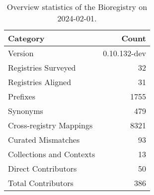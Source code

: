 \begin{table}
\caption{Overview statistics of the Bioregistry on 2024-02-01.}
\label{tab:bioregistry-summary}
\begin{tabular}{lr}
\toprule
Category & Count \\
\midrule
Version & 0.10.132-dev \\
Registries Surveyed & 32 \\
Registries Aligned & 31 \\
Prefixes & 1755 \\
Synonyms & 479 \\
Cross-registry Mappings & 8321 \\
Curated Mismatches & 93 \\
Collections and Contexts & 13 \\
Direct Contributors & 50 \\
Total Contributors & 386 \\
\bottomrule
\end{tabular}
\end{table}
